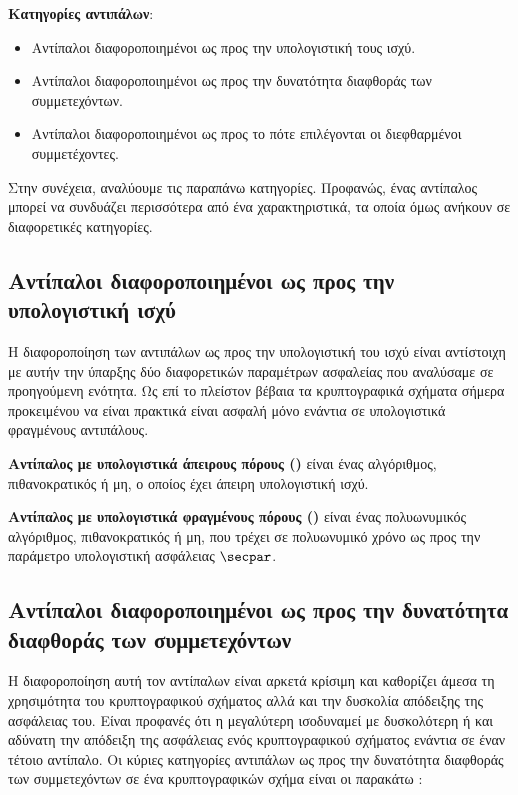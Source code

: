 \begin{definition}
\textbf{Κατηγορίες αντιπάλων}:
\begin{itemize}
    \item Αντίπαλοι διαφοροποιημένοι ως προς την υπολογιστική τους ισχύ.
    \item Αντίπαλοι διαφοροποιημένοι ως προς την δυνατότητα διαφθοράς των συμμετεχόντων.
    \item Αντίπαλοι διαφοροποιημένοι ως προς το πότε επιλέγονται οι διεφθαρμένοι συμμετέχοντες.
\end{itemize}
\end{definition}

Στην συνέχεια, αναλύουμε τις παραπάνω κατηγορίες. Προφανώς, ένας αντίπαλος μπορεί να συνδυάζει περισσότερα από ένα χαρακτηριστικά, τα οποία όμως ανήκουν σε διαφορετικές κατηγορίες.

\subsection{Αντίπαλοι διαφοροποιημένοι ως προς την υπολογιστική ισχύ}

Η διαφοροποίηση των αντιπάλων ως προς την υπολογιστική του ισχύ είναι αντίστοιχη με αυτήν την ύπαρξης δύο διαφορετικών παραμέτρων ασφαλείας που αναλύσαμε σε προηγούμενη ενότητα. Ως επί το πλείστον βέβαια τα κρυπτογραφικά σχήματα σήμερα προκειμένου να είναι πρακτικά είναι ασφαλή μόνο ενάντια σε υπολογιστικά φραγμένους αντιπάλους.

\begin{definition}
\textbf{Αντίπαλος με υπολογιστικά άπειρους πόρους ()} είναι ένας αλγόριθμος, πιθανοκρατικός ή μη, ο οποίος έχει άπειρη υπολογιστική ισχύ.
\end{definition}

\begin{definition}
\textbf{Αντίπαλος με υπολογιστικά φραγμένους πόρους ()} είναι ένας πολυωνυμικός αλγόριθμος, πιθανοκρατικός ή μη, που τρέχει σε πολυωνυμικό χρόνο ως προς την παράμετρο υπολογιστική ασφάλειας $\secpar$.
\end{definition}

\subsection{Αντίπαλοι διαφοροποιημένοι ως προς την δυνατότητα διαφθοράς των συμμετεχόντων}

Η διαφοροποίηση αυτή τον αντίπαλων είναι αρκετά κρίσιμη και καθορίζει άμεσα τη χρησιμότητα του κρυπτογραφικού σχήματος αλλά και την δυσκολία απόδειξης της ασφάλειας του. Είναι προφανές ότι η μεγαλύτερη ισοδυναμεί με δυσκολότερη ή και αδύνατη την απόδειξη της ασφάλειας ενός κρυπτογραφικού σχήματος ενάντια σε έναν τέτοιο αντίπαλο. Οι κύριες κατηγορίες αντιπάλων ως προς την δυνατότητα διαφθοράς των συμμετεχόντων σε ένα κρυπτογραφικών σχήμα είναι οι παρακάτω :

